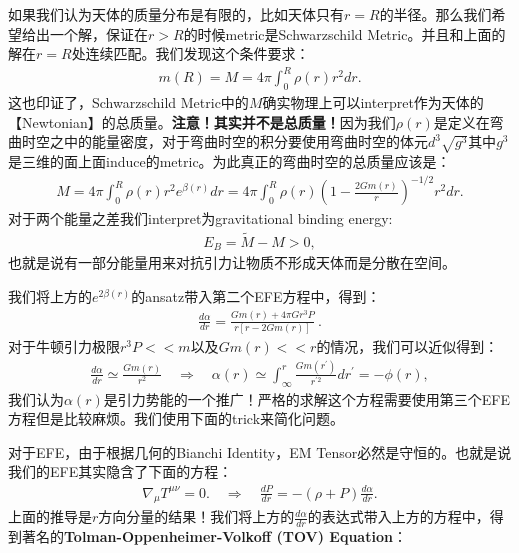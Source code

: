 \bigskip
{}

如果我们认为天体的质量分布是有限的，比如天体只有$ r = R $的半径。那么我们希望给出一个解，保证在$ r > R
$的时候metric是Schwarzschild Metric。并且和上面的解在$ r = R $处连续匹配。我们发现这个条件要求：
\begin{align}
  m(R) = M = 4\pi \int_0^R \rho(r) r^2 dr.
\end{align}
这也印证了，Schwarzschild Metric中的$ M
$确实物理上可以interpret作为天体的【Newtonian】的总质量。\textbf{注意！其实并不是总质量！}因为我们$
\rho(r) $是定义在弯曲时空之中的能量密度，对于弯曲时空的积分要使用弯曲时空的体元$ d^3 \sqrt{g^3} $其中$ g^3
$是三维的面上面induce的metric。为此真正的弯曲时空的总质量应该是：
\begin{align}
  M=4\pi\int_0^R\rho(r)r^2e^{\beta(r)}dr=4\pi\int_0^R\rho(r)\left(1-\frac{2Gm(r)}{r}\right)^{-1/2}r^2dr.
\end{align}
对于两个能量之差我们interpret为gravitational binding energy:
\begin{align}
  E_B=\tilde{M}-M>0,
\end{align}
也就是说有一部分能量用来对抗引力让物质不形成天体而是分散在空间。

\bigskip
{}

我们将上方的$ e^{2\beta(r)} $的ansatz带入第二个EFE方程中，得到：
\begin{align}
  \frac{d\alpha}{dr}=\frac{Gm(r)+4\pi Gr^3P}{r[r-2Gm(r)]}\mathrm{~.}
\end{align}
对于牛顿引力极限$ r^3 P << m $以及$ Gm(r) << r $的情况，我们可以近似得到：
\begin{align}
  \frac{d\alpha}{dr} \simeq \frac{Gm(r)}{r^2} \quad \Rightarrow \quad
  \alpha(r) \simeq \int_\infty^r \frac{Gm(r^{\prime})}{r^{\prime2}}
  dr^{\prime} = -\phi(r),
\end{align}
我们认为$ \alpha(r) $是引力势能的一个推广！严格的求解这个方程需要使用第三个EFE方程但是比较麻烦。我们使用下面的trick来简化问题。

\bigskip
{}

对于EFE，由于根据几何的Bianchi Identity，EM Tensor必然是守恒的。也就是说我们的EFE其实隐含了下面的方程：
\begin{align}
  \nabla_\mu T^{\mu\nu} = 0. \quad \Rightarrow \quad \frac{dP}{dr} =
  -(\rho + P) \frac{d\alpha}{dr}.
\end{align}
上面的推导是$ r $方向分量的结果！我们将上方的$ \frac{d\alpha}{dr}
$的表达式带入上方的方程中，得到著名的\textbf{Tolman-Oppenheimer-Volkoff (TOV) Equation}：


